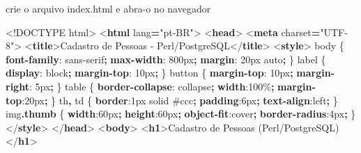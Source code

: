 \documentclass[
]{book}
\newenvironment{Shaded}{\begin{snugshade}}{\end{snugshade}}
\newcommand{\BuiltInTok}[1]{#1}
\newcommand{\CharTok}[1]{\textcolor[rgb]{0.31,0.60,0.02}{#1}}
\newcommand{\ConstantTok}[1]{\textcolor[rgb]{0.56,0.35,0.01}{#1}}
\newcommand{\DataTypeTok}[1]{\textcolor[rgb]{0.13,0.29,0.53}{#1}}
\newcommand{\DecValTok}[1]{\textcolor[rgb]{0.00,0.00,0.81}{#1}}
\newcommand{\FunctionTok}[1]{\textcolor[rgb]{0.13,0.29,0.53}{\textbf{#1}}}
\newcommand{\KeywordTok}[1]{\textcolor[rgb]{0.13,0.29,0.53}{\textbf{#1}}}
\newcommand{\NormalTok}[1]{#1}
\newcommand{\OperatorTok}[1]{\textcolor[rgb]{0.81,0.36,0.00}{\textbf{#1}}}
\newcommand{\OtherTok}[1]{\textcolor[rgb]{0.56,0.35,0.01}{#1}}
\newcommand{\StringTok}[1]{\textcolor[rgb]{0.31,0.60,0.02}{#1}}
\begin{document}
crie o arquivo index.html e abra-o no navegador

\begin{Shaded}
\begin{Highlighting}[]
\DataTypeTok{\textless{}!DOCTYPE}\NormalTok{ html}\DataTypeTok{\textgreater{}}
\DataTypeTok{\textless{}}\KeywordTok{html}\OtherTok{ lang}\OperatorTok{=}\StringTok{"pt{-}BR"}\DataTypeTok{\textgreater{}}
\DataTypeTok{\textless{}}\KeywordTok{head}\DataTypeTok{\textgreater{}}
\DataTypeTok{\textless{}}\KeywordTok{meta}\OtherTok{ charset}\OperatorTok{=}\StringTok{"UTF{-}8"}\DataTypeTok{\textgreater{}}
\DataTypeTok{\textless{}}\KeywordTok{title}\DataTypeTok{\textgreater{}}\NormalTok{Cadastro de Pessoas {-} Perl/PostgreSQL}\DataTypeTok{\textless{}/}\KeywordTok{title}\DataTypeTok{\textgreater{}}
\DataTypeTok{\textless{}}\KeywordTok{style}\DataTypeTok{\textgreater{}}
\NormalTok{  body \{ }\KeywordTok{font{-}family}\CharTok{:} \DecValTok{sans{-}serif}\OperatorTok{;} \KeywordTok{max{-}width}\CharTok{:} \DecValTok{800}\DataTypeTok{px}\OperatorTok{;} \KeywordTok{margin}\CharTok{:} \DecValTok{20}\DataTypeTok{px} \BuiltInTok{auto}\OperatorTok{;}\NormalTok{ \}}
\NormalTok{  label \{ }\KeywordTok{display}\CharTok{:} \DecValTok{block}\OperatorTok{;} \KeywordTok{margin{-}top}\CharTok{:} \DecValTok{10}\DataTypeTok{px}\OperatorTok{;}\NormalTok{ \}}
\NormalTok{  button \{ }\KeywordTok{margin{-}top}\CharTok{:} \DecValTok{10}\DataTypeTok{px}\OperatorTok{;} \KeywordTok{margin{-}right}\CharTok{:} \DecValTok{5}\DataTypeTok{px}\OperatorTok{;}\NormalTok{ \}}
\NormalTok{  table \{ }\KeywordTok{border{-}collapse}\CharTok{:} \DecValTok{collapse}\OperatorTok{;} \KeywordTok{width}\CharTok{:}\DecValTok{100}\DataTypeTok{\%}\OperatorTok{;} \KeywordTok{margin{-}top}\CharTok{:}\DecValTok{20}\DataTypeTok{px}\OperatorTok{;}\NormalTok{ \}}
\NormalTok{  th}\OperatorTok{,}\NormalTok{ td \{ }\KeywordTok{border}\CharTok{:}\DecValTok{1}\DataTypeTok{px} \DecValTok{solid} \ConstantTok{\#ccc}\OperatorTok{;} \KeywordTok{padding}\CharTok{:}\DecValTok{6}\DataTypeTok{px}\OperatorTok{;} \KeywordTok{text{-}align}\CharTok{:}\DecValTok{left}\OperatorTok{;}\NormalTok{ \}}
\NormalTok{  img}\FunctionTok{.thumb}\NormalTok{ \{ }\KeywordTok{width}\CharTok{:}\DecValTok{60}\DataTypeTok{px}\OperatorTok{;} \KeywordTok{height}\CharTok{:}\DecValTok{60}\DataTypeTok{px}\OperatorTok{;} \KeywordTok{object{-}fit}\CharTok{:}\DecValTok{cover}\OperatorTok{;} \KeywordTok{border{-}radius}\CharTok{:}\DecValTok{4}\DataTypeTok{px}\OperatorTok{;}\NormalTok{ \}}
\DataTypeTok{\textless{}/}\KeywordTok{style}\DataTypeTok{\textgreater{}}
\DataTypeTok{\textless{}/}\KeywordTok{head}\DataTypeTok{\textgreater{}}
\DataTypeTok{\textless{}}\KeywordTok{body}\DataTypeTok{\textgreater{}}
\DataTypeTok{\textless{}}\KeywordTok{h1}\DataTypeTok{\textgreater{}}\NormalTok{Cadastro de Pessoas (Perl/PostgreSQL)}\DataTypeTok{\textless{}/}\KeywordTok{h1}\DataTypeTok{\textgreater{}}


\end{Highlighting}
\end{Shaded}
\end{document}
